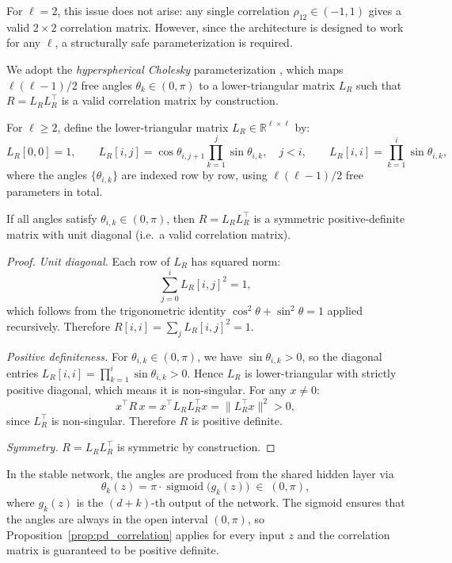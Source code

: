 For $\ell = 2$, this issue does not arise: any single correlation $\rho_{12} \in (-1,1)$ gives a valid $2 \times 2$ correlation matrix.
However, since the architecture is designed to work for any $\ell$, a structurally safe parameterization is required.

We adopt the \emph{hyperspherical Cholesky} parameterization \citep{Pinheiro1996}, which maps $\ell(\ell-1)/2$ free angles $\theta_k \in (0,\pi)$ to a lower-triangular matrix $L_R$ such that $R = L_R L_R^\top$ is a valid correlation matrix by construction.

\begin{definition}
\label{def:hyperspherical_cholesky}
For $\ell \geq 2$, define the lower-triangular matrix $L_R \in \mathbb{R}^{\ell \times \ell}$ by:
\[
L_R[0,0] = 1, \qquad
L_R[i,j] = \cos\theta_{i,j+1}\prod_{k=1}^{j}\sin\theta_{i,k}, \quad j < i, \qquad
L_R[i,i] = \prod_{k=1}^{i}\sin\theta_{i,k},
\]
where the angles $\{\theta_{i,k}\}$ are indexed row by row, using $\ell(\ell-1)/2$ free parameters in total.
\end{definition}

\begin{proposition}
\label{prop:pd_correlation}
If all angles satisfy $\theta_{i,k} \in (0,\pi)$, then $R = L_R L_R^\top$ is a symmetric positive-definite matrix with unit diagonal (i.e.\ a valid correlation matrix).
\end{proposition}

\begin{proof}
\emph{Unit diagonal.} Each row of $L_R$ has squared norm:
\[
\sum_{j=0}^{i} L_R[i,j]^2 = 1,
\]
which follows from the trigonometric identity $\cos^2\theta + \sin^2\theta = 1$ applied recursively.
Therefore $R[i,i] = \sum_j L_R[i,j]^2 = 1$.

\emph{Positive definiteness.} For $\theta_{i,k} \in (0,\pi)$, we have $\sin\theta_{i,k} > 0$, so the diagonal entries $L_R[i,i] = \prod_{k=1}^{i}\sin\theta_{i,k} > 0$.
Hence $L_R$ is lower-triangular with strictly positive diagonal, which means it is non-singular.
For any $x \neq 0$:
\[
x^\top R\, x = x^\top L_R L_R^\top x = \|L_R^\top x\|^2 > 0,
\]
since $L_R^\top$ is non-singular. Therefore $R$ is positive definite.

\emph{Symmetry.} $R = L_R L_R^\top$ is symmetric by construction.
\end{proof}

In the stable network, the angles are produced from the shared hidden layer via
\[
\theta_k(z) = \pi \cdot \operatorname{sigmoid}\!\bigl(g_k(z)\bigr) \;\in\; (0,\pi),
\]
where $g_k(z)$ is the $(d+k)$-th output of the network.
The sigmoid ensures that the angles are always in the open interval $(0,\pi)$, so Proposition~\ref{prop:pd_correlation} applies for every input $z$ and the correlation matrix is guaranteed to be positive definite.

